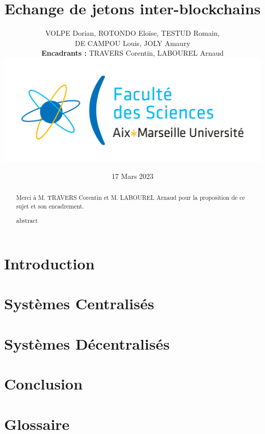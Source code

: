 \documentclass{article}
\newenvironment*{remerciements}{%
  \renewcommand*{\abstractname}{Remerciements}
  \begin{abstract}
}{
  \end{abstract}
}
\begin{document}
\title{Echange de jetons inter-blockchains}
\author{VOLPE Dorian, ROTONDO Eloïse, TESTUD Romain,\\DE CAMPOU Louis, JOLY Amaury  \\ \textbf{Encadrants :} TRAVERS Corentin, LABOUREL Arnaud \\ \includegraphics[scale=0.1]{./img/amu.png}}
\date{17 Mars 2023}

\begin{titlepage}
  \maketitle
\end{titlepage}

\begin{remerciements}
  Merci à M. TRAVERS Corentin et M. LABOUREL Arnaud pour la proposition de ce sujet et son encadrement.
\end{remerciements}
\begin{abstract}
  abstract
\end{abstract}

\newpage

\tableofcontents

\newpage

\section{Introduction}


\section{Systèmes Centralisés}


\section{Systèmes Décentralisés}


\section{Conclusion}


\section{Glossaire}


\printbibliography
\end{document}
